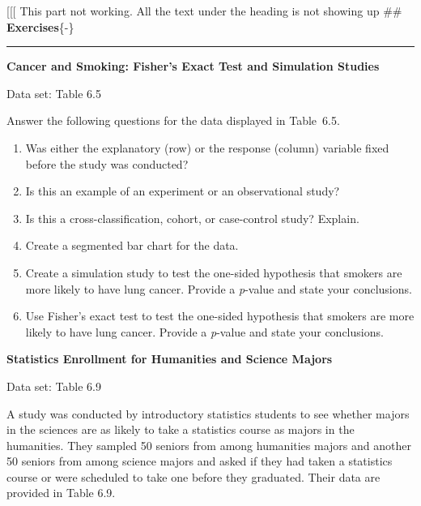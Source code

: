 \documentclass[
]{report}
\let\theexcount\relax
\begin{document}
{[}{[}{[} This part not working. All the text under the heading is not showing up
\#\# \textbf{Exercises}\{-\}
\vspace{-2em}
\noindent

\rule{\linewidth}{0.4pt}

\renewcommand{\theexcount}{E\arabic{excount}}

\begin{list}{E.}{ \setlength{\itemsep}{0.5em}}

  \item \textbf{Cancer and Smoking: Fisher’s Exact Test and Simulation Studies}    

  Data set: Table 6.5    

  Answer the following questions for the data displayed in Table 6.5.  
  \begin{enumerate}
    \item Was either the explanatory (row) or the response (column) variable fixed before the study was conducted?
    \item Is this an example of an experiment or an observational study?
    \item Is this a cross-classification, cohort, or case-control study? Explain.
    \item Create a segmented bar chart for the data.
    \item Create a simulation study to test the one-sided hypothesis that smokers are more likely to have lung cancer. Provide a \textit{p}-value and state your conclusions.
    \item Use Fisher’s exact test to test the one-sided hypothesis that smokers are more likely to have lung cancer. Provide a \textit{p}-value and state your conclusions.
  \end{enumerate}

  \item \textbf{Statistics Enrollment for Humanities and Science Majors}    

  Data set: Table 6.9    

  A study was conducted by introductory statistics students to see whether majors in the sciences are as likely to take a statistics course as majors in the humanities. They sampled 50 seniors from among humanities majors and another 50 seniors from among science majors and asked if they had taken a statistics course or were scheduled to take one before they graduated. Their data are provided in Table 6.9.  
  

\end{list}
\end{document}
